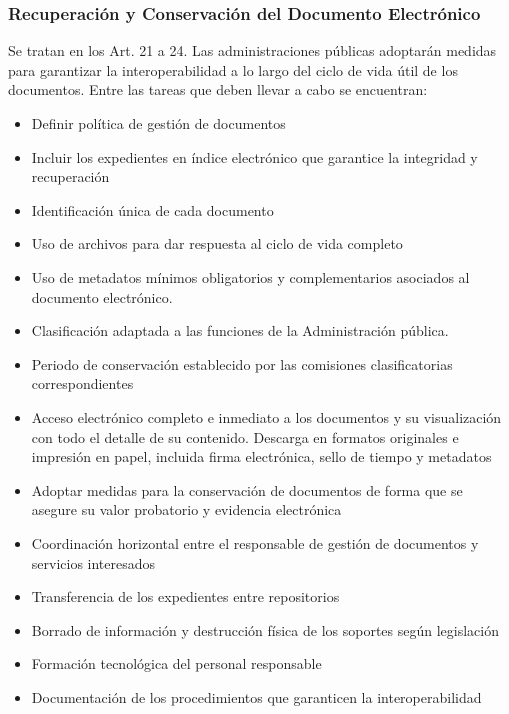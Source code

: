     \subsubsection{Recuperación y Conservación del Documento Electrónico} %
        Se tratan en los Art. 21 a 24. Las administraciones públicas adoptarán medidas para garantizar la interoperabilidad a lo largo del ciclo de vida útil de los documentos. Entre las tareas que deben llevar a cabo se encuentran:
        \begin{itemize}
            \item Definir política de gestión de documentos
            \item Incluir los expedientes en índice electrónico que garantice la integridad y recuperación
            \item Identificación única de cada documento
            \item Uso de archivos para dar respuesta al ciclo de vida completo
            \item Uso de metadatos mínimos obligatorios y complementarios asociados al documento electrónico.
            \item Clasificación adaptada a las funciones de la Administración pública.
            \item Periodo de conservación establecido por las comisiones clasificatorias correspondientes
            \item Acceso electrónico completo e inmediato a los documentos y su visualización con todo el detalle de su contenido. Descarga en formatos originales e impresión en papel, incluida firma electrónica, sello de tiempo y metadatos
            \item Adoptar medidas para la conservación de documentos de forma que se asegure su valor probatorio y evidencia electrónica 
            \item Coordinación horizontal entre el responsable de gestión de documentos y servicios interesados
            \item Transferencia de los expedientes entre repositorios
            \item Borrado de información y destrucción física de los soportes según legislación
            \item Formación tecnológica del personal responsable
            \item Documentación de los procedimientos que garanticen la interoperabilidad
        \end{itemize}

